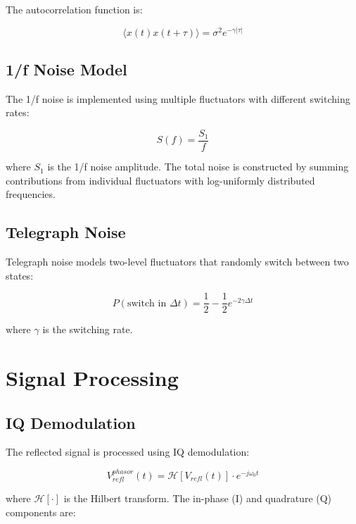 \documentclass[11pt,a4paper]{article}
\begin{document}
The autocorrelation function is:

\begin{equation}
\langle x(t) x(t+\tau) \rangle = \sigma^2 e^{-\gamma|\tau|}
\end{equation}

\subsection{1/f Noise Model}

The 1/f noise is implemented using multiple fluctuators with different switching rates:

\begin{equation}
S(f) = \frac{S_1}{f}
\end{equation}

where $S_1$ is the 1/f noise amplitude. The total noise is constructed by summing contributions from individual fluctuators with log-uniformly distributed frequencies.

\subsection{Telegraph Noise}

Telegraph noise models two-level fluctuators that randomly switch between two states:

\begin{equation}
P(\text{switch in } \Delta t) = \frac{1}{2} - \frac{1}{2} e^{-2\gamma \Delta t}
\end{equation}

where $\gamma$ is the switching rate.

\section{Signal Processing}

\subsection{IQ Demodulation}

The reflected signal is processed using IQ demodulation:

\begin{equation}
V_{refl}^{phasor}(t) = \mathcal{H}[V_{refl}(t)] \cdot e^{-j\omega_0 t}
\end{equation}

where $\mathcal{H}[\cdot]$ is the Hilbert transform. The in-phase (I) and quadrature (Q) components are:
\end{document}
